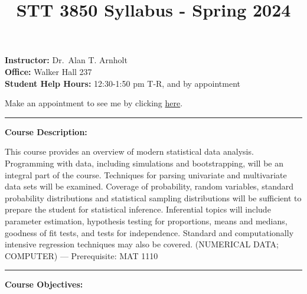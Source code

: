 \documentclass[
]{article}
\title{STT 3850 Syllabus - Spring 2024}
\author{}
\date{\vspace{-2.5em}}
\begin{document}
\maketitle

\textbf{Instructor:} Dr.~Alan T. Arnholt\\
\textbf{Office:} Walker Hall 237\\
\textbf{Student Help Hours:} 12:30-1:50 pm T-R, and by appointment

Make an appointment to see me by clicking
\href{https://calendar.google.com/calendar/u/0/selfsched?sstoken=UUtZb3I1Z1pFczdjfGRlZmF1bHR8MTZjOTU5MGY0ZTFlOTA2MmExNzhlYWQ5MGIzZWQ0OGM}{here}.

\begin{center}\rule{0.5\linewidth}{0.5pt}\end{center}

\textbf{Course Description:}

This course provides an overview of modern statistical data analysis.
Programming with data, including simulations and bootstrapping, will be
an integral part of the course. Techniques for parsing univariate and
multivariate data sets will be examined. Coverage of probability, random
variables, standard probability distributions and statistical sampling
distributions will be sufficient to prepare the student for statistical
inference. Inferential topics will include parameter estimation,
hypothesis testing for proportions, means and medians, goodness of fit
tests, and tests for independence. Standard and computationally
intensive regression techniques may also be covered. (NUMERICAL DATA;
COMPUTER) --- Prerequisite: MAT 1110

\begin{center}\rule{0.5\linewidth}{0.5pt}\end{center}

\textbf{Course Objectives:}
\end{document}

